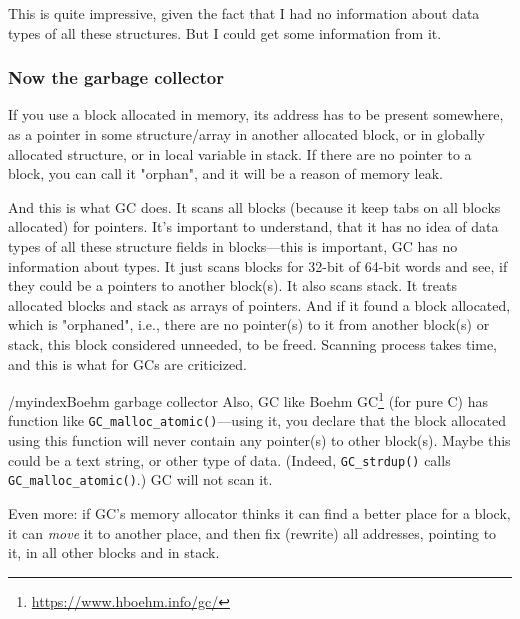 This is quite impressive, given the fact that I had no information about data types of all these structures.
But I could get some information from it.

\subsubsection{Now the garbage collector}

If you use a block allocated in memory, its address has to be present somewhere, as a pointer in some structure/array in another allocated block,
or in globally allocated structure, or in local variable in stack.
If there are no pointer to a block, you can call it "orphan", and it will be a reason of memory leak.

And this is what \ac{GC} does.
It scans all blocks (because it keep tabs on all blocks allocated) for pointers.
It's important to understand, that it has no idea of data types of all these structure fields in blocks---this is important, \ac{GC} has no information about types.
It just scans blocks for 32-bit of 64-bit words and see, if they could be a pointers to another block(s).
It also scans stack.
It treats allocated blocks and stack as arrays of pointers.
And if it found a block allocated, which is "orphaned", i.e., there are no pointer(s) to it from another block(s) or stack, this block considered unneeded, to be freed.
Scanning process takes time, and this is what for \ac{GC}s are criticized.

/myindex{Boehm garbage collector}
Also, \ac{GC} like Boehm GC\footnote{\url{https://www.hboehm.info/gc/}} (for pure C) has function like \verb|GC_malloc_atomic()|---using it, you declare that the block allocated
using this function will never contain any pointer(s) to other block(s).
Maybe this could be a text string, or other type of data.
(Indeed, \verb|GC_strdup()| calls \verb|GC_malloc_atomic()|.)
\ac{GC} will not scan it.

Even more: if \ac{GC}'s memory allocator thinks it can find a better place for a block, it can \emph{move} it to another place, and then fix (rewrite) all addresses,
pointing to it, in all other blocks and in stack.

